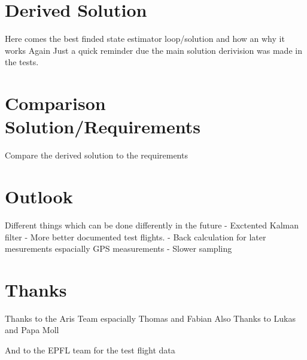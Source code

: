 \section{Derived Solution}
Here comes the best finded state estimator loop/solution and how an why it works
Again Just a quick reminder due the main solution derivision was made in the tests.


\section{Comparison Solution/Requirements}
Compare the derived solution to the requirements

\section{Outlook}
Different things which can be done differently in the future
- Exctented Kalman filter
- More better documented test flights.
- Back calculation for later mesurements espacially GPS measurements
- Slower sampling

\section{Thanks}
Thanks to the Aris Team espacially Thomas and Fabian
Also Thanks to Lukas and Papa Moll

And to the EPFL team for the test flight data

